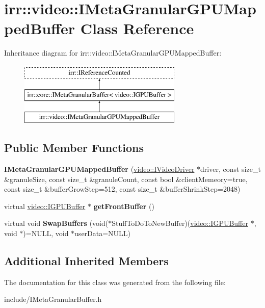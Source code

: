 \hypertarget{classirr_1_1video_1_1IMetaGranularGPUMappedBuffer}{}\section{irr\+:\+:video\+:\+:I\+Meta\+Granular\+G\+P\+U\+Mapped\+Buffer Class Reference}
\label{classirr_1_1video_1_1IMetaGranularGPUMappedBuffer}
Inheritance diagram for irr\+:\+:video\+:\+:I\+Meta\+Granular\+G\+P\+U\+Mapped\+Buffer\+:\begin{figure}[H]
\begin{center}
\leavevmode
\includegraphics[height=3.000000cm]{classirr_1_1video_1_1IMetaGranularGPUMappedBuffer}
\end{center}
\end{figure}
\subsection*{Public Member Functions}
\begin{DoxyCompactItemize}
\item 
{\bfseries I\+Meta\+Granular\+G\+P\+U\+Mapped\+Buffer} (\hyperlink{classirr_1_1video_1_1IVideoDriver}{video\+::\+I\+Video\+Driver} $\ast$driver, const size\+\_\+t \&granule\+Size, const size\+\_\+t \&granule\+Count, const bool \&client\+Memeory=true, const size\+\_\+t \&buffer\+Grow\+Step=512, const size\+\_\+t \&buffer\+Shrink\+Step=2048)\hypertarget{classirr_1_1video_1_1IMetaGranularGPUMappedBuffer_a9f89e94296ed8b68dfec6c511670bf0d}{}\label{classirr_1_1video_1_1IMetaGranularGPUMappedBuffer_a9f89e94296ed8b68dfec6c511670bf0d}

\item 
virtual \hyperlink{classirr_1_1video_1_1IGPUBuffer}{video\+::\+I\+G\+P\+U\+Buffer} $\ast$ {\bfseries get\+Front\+Buffer} ()\hypertarget{classirr_1_1video_1_1IMetaGranularGPUMappedBuffer_a08b6d77a85676200aa9a9289ef152947}{}\label{classirr_1_1video_1_1IMetaGranularGPUMappedBuffer_a08b6d77a85676200aa9a9289ef152947}

\item 
virtual void {\bfseries Swap\+Buffers} (void($\ast$Stuff\+To\+Do\+To\+New\+Buffer)(\hyperlink{classirr_1_1video_1_1IGPUBuffer}{video\+::\+I\+G\+P\+U\+Buffer} $\ast$, void $\ast$)=N\+U\+LL, void $\ast$user\+Data=N\+U\+LL)\hypertarget{classirr_1_1video_1_1IMetaGranularGPUMappedBuffer_a20e99ec2be4138ac0cced78b15b2f33a}{}\label{classirr_1_1video_1_1IMetaGranularGPUMappedBuffer_a20e99ec2be4138ac0cced78b15b2f33a}

\end{DoxyCompactItemize}
\subsection*{Additional Inherited Members}


The documentation for this class was generated from the following file\+:\begin{DoxyCompactItemize}
\item 
include/I\+Meta\+Granular\+Buffer.\+h\end{DoxyCompactItemize}

